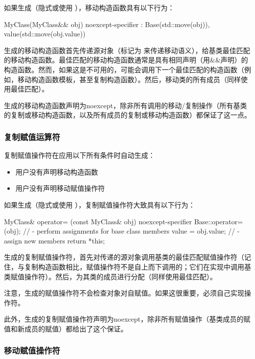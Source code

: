 如果生成（隐式或使用 ），移动构造函数具有以下行为：

\begin{cppcode}
MyClass(MyClass&& obj) noexcept-specifier
: Base(std::move(obj)), value(std::move(obj.value)) {
}
\end{cppcode}

生成的移动构造函数首先传递源对象（标记为  来传递移动语义），给基类最佳匹配的移动构造函数。最佳匹配的移动构造函数通常是具有相同声明（用\&\&声明）的构造函数。然而，如果这是不可用的，可能会调用下一个最佳匹配的构造函数（例如，移动构造函数模板，甚至复制构造函数）。然后，移动类的所有成员（同样使用最佳匹配）。

生成的移动构造函数声明为noexcept，除非所有调用的移动/复制操作（所有基类的复制或移动构造函数，以及所有成员的复制或移动构造函数）都保证了这一点。

\subsubsection{复制赋值运算符}

复制赋值操作符在应用以下所有条件时自动生成：

\begin{itemize}
	\item 用户没有声明移动构造函数
	\item 用户没有声明移动赋值操作符
\end{itemize}

如果生成（隐式或使用 ），复制赋值操作符大致具有以下行为：

\begin{cppcode}
MyClass& operator= (const MyClass& obj) noexcept-specifier {
	Base::operator=(obj); // - perform assignments for base class members
	value = obj.value; // - assign new members
	return *this;
}
\end{cppcode}

生成的复制赋值操作符，首先对传递的源对象调用基类的最佳匹配赋值操作符（记住，与复制构造函数相比，赋值操作符不是自上而下调用的；它们在实现中调用基类赋值操作符）。然后，为其类的成员进行分配（同样使用最佳匹配）。

注意，生成的赋值操作符不会检查对象对自赋值。如果这很重要，必须自己实现操作符。

此外，生成的复制赋值操作符声明为noexcept，除非所有赋值操作（基类成员的赋值和新成员的赋值）都给出了这个保证。

\subsubsection{移动赋值操作符}

